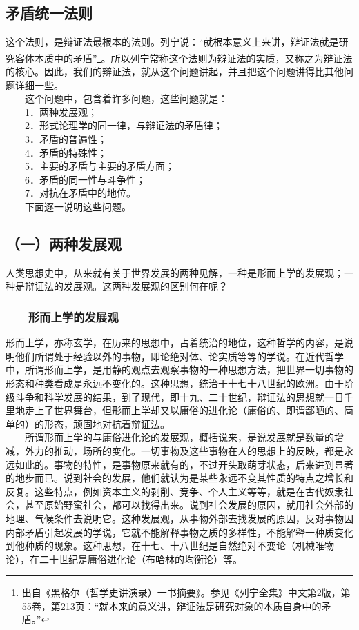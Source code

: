 \documentclass[cn,11pt,chinese]{elegantbook}
\def\myformat#1{\hfil\hfil #1}
\begin{document}
\subsection*{\myformat{矛盾统一法则}}
这个法则，是辩证法最根本的法则。列宁说：“就根本意义上来讲，辩证法就是研究客体本质中的矛盾”\footnote[3]{ 出自《黑格尔（哲学史讲演录）一书摘要》。参见《列宁全集》中文第2版，第55卷，第213页：“就本来的意义讲，辩证法是研究对象的本质自身中的矛盾。”}。所以列宁常称这个法则为辩证法的实质，又称之为辩证法的核心。因此，我们的辩证法，就从这个问题讲起，并且把这个问题讲得比其他问题详细一些。\\
　　这个问题中，包含着许多问题，这些问题就是：\\
　　1．两种发展观；\\
　　2．形式论理学的同一律，与辩证法的矛盾律；\\
　　3．矛盾的普遍性；\\
　　4．矛盾的特殊性；\\
　　5．主要的矛盾与主要的矛盾方面；\\
　　6．矛盾的同一性与斗争性；\\
　　7．对抗在矛盾中的地位。\\
　　下面逐一说明这些问题。\\
\subsection*{\myformat{（一）两种发展观}}
人类思想史中，从来就有关于世界发展的两种见解，一种是形而上学的发展观；一种是辩证法的发展观。这两种发展观的区别何在呢？\\
\subsubsection*{\myformat{　　形而上学的发展观}}
形而上学，亦称玄学，在历来的思想中，占着统治的地位，这种哲学的内容，是说明他们所谓处于经验以外的事物，即论绝对体、论实质等等的学说。在近代哲学中，所谓形而上学，是用静的观点去观察事物的一种思想方法，把世界一切事物的形态和种类看成是永远不变化的。这种思想，统治于十七十八世纪的欧洲。由于阶级斗争和科学发展的结果，到了现代，即十九、二十世纪，辩证法的思想就一日千里地走上了世界舞台，但形而上学却又以庸俗的进化论（庸俗的、即谓鄙陋的、简单的）的形态，顽固地对抗着辩证法。\\
　　所谓形而上学的与庸俗进化论的发展观，概括说来，是说发展就是数量的增减，外力的推动，场所的变化。一切事物及这些事物在人的思想上的反映，都是永远如此的。事物的特性，是事物原来就有的，不过开头取萌芽状态，后来进到显著的地步而已。说到社会的发展，他们就认为是某些永远不变其性质的特点之增长和反复。这些特点，例如资本主义的剥削、竞争、个人主义等等，就是在古代奴隶社会，甚至原始野蛮社会，都可以找得出来。说到社会发展的原因，就用社会外部的地理、气候条件去说明它。这种发展观，从事物外部去找发展的原因，反对事物因内部矛盾引起发展的学说，它就不能解释事物之质的多样性，不能解释一种质变化到他种质的现象。这种思想，在十七、十八世纪是自然绝对不变论（机械唯物论），在二十世纪是庸俗进化论（布哈林的均衡论）等。\\
\end{document}
